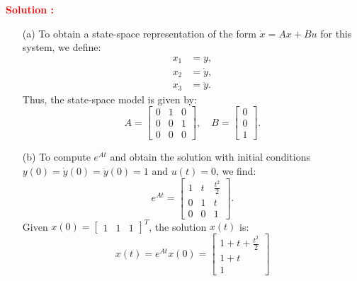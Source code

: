 \documentclass[12pt]{article}
\begin{document}
\textbf{\textcolor{red}{Solution :}}

\begin{enumerate}
    \item[(a)] To obtain a state-space representation of the form \(\dot{x} = Ax + Bu\) for this system, we define:
    \begin{align*}
        x_1 &= y, \\
        x_2 &= \dot{y}, \\
        x_3 &= \ddot{y}.
    \end{align*}
    Thus, the state-space model is given by:
    \[
    A = \begin{bmatrix} 0 & 1 & 0 \\ 0 & 0 & 1 \\ 0 & 0 & 0 \end{bmatrix}, \quad B = \begin{bmatrix} 0 \\ 0 \\ 1 \end{bmatrix}.
    \]

    \item[(b)] To compute \(e^{At}\) and obtain the solution with initial conditions \(y(0) = \dot{y}(0) = \ddot{y}(0) = 1\) and \(u(t) = 0\), we find:
    \[
    e^{At} = \begin{bmatrix} 1 & t & \frac{t^2}{2} \\ 0 & 1 & t \\ 0 & 0 & 1 \end{bmatrix}.
    \]
    Given \(x(0) = \begin{bmatrix} 1 & 1 & 1 \end{bmatrix}^T\), the solution \(x(t)\) is:
\begin{equation}
    x(t) = e^{At}x(0) = \begin{bmatrix}
        1+t+\frac{t^2}{2} \\ 1+t \\ 1
    \end{bmatrix}
\end{equation}

\end{enumerate}
\end{document}

